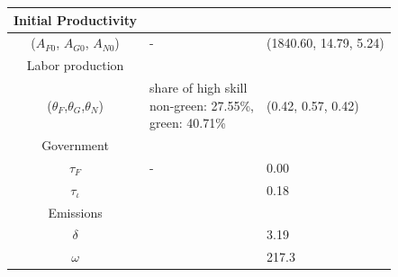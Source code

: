 \begin{table}[h!]
\begin{center}
{\begin{tabular}{c|ll}
 			\hline
 			Initial Productivity&\multicolumn{2}{c}{}\\
 			\hline
 			($A_{F0}$, $A_{G0}$, $A_{N0}$)&- &(1840.60, 14.79, 5.24)  \\
 			\hline 
 				Labor production&\multicolumn{2}{c}{}\\ 			
 			\hline
 			($\theta_F$,$\theta_G$,$\theta_N$)&\makecell[l]{share of high skill\\ non-green: 27.55\%,\\ green: 40.71\% \citep{Consoli2016DoCapital} }& (0.42, 0.57, 0.42)\\
 			\hline
 			Government&\multicolumn{2}{c}{}\\
 			\hline
 			$\tau_F$&- &0.00\\
 			$\tau_\iota$&\cite{Heathcote2017OptimalFramework} &0.18\\
 			\hline
 			Emissions&\multicolumn{2}{c}{}\\
 			\hline
 			$\delta$& \makecell[l]{\cite{EPAems}}&3.19\\
 			$\omega$& \cite{EPAems}&217.3\\
 			\hline \hline
 		\end{tabular}
 	}
 	\end{center}
 \end{table}
 
 
 
 




